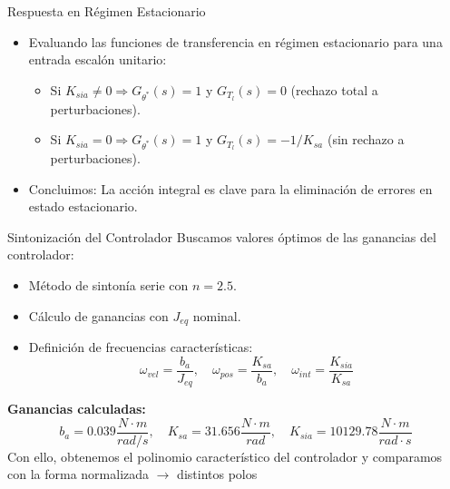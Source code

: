 \documentclass[12pt]{beamer}
\begin{document}
\begin{frame}{Respuesta en Régimen Estacionario}
    \begin{itemize}
        \item Evaluando las funciones de transferencia en régimen estacionario para una entrada escalón unitario:
        \begin{itemize}
            \item Si $K_{sia} \neq 0 \Rightarrow G_{\theta^*}(s) = 1$ y $G_{T_l}(s) = 0$ (rechazo total a perturbaciones).
            \item Si $K_{sia} = 0 \Rightarrow G_{\theta^*}(s) = 1$ y $G_{T_l}(s) = -1/K_{sa}$ (sin rechazo a perturbaciones).
        \end{itemize}
        \item Concluimos: La acción integral es clave para la eliminación de errores en estado estacionario.
    \end{itemize}
\end{frame}

\begin{frame}{Sintonización del Controlador}
Buscamos valores óptimos de las ganancias del controlador:
    \begin{itemize}
        \item Método de sintonía serie con $n = 2.5$.
        \item Cálculo de ganancias con $J_{eq}$ nominal.
        \item Definición de frecuencias características:
        \begin{equation}
            \omega_{vel} = \frac{b_a}{J_{eq}}, \quad \omega_{pos} = \frac{K_{sa}}{b_a}, \quad \omega_{int} = \frac{K_{sia}}{K_{sa}}
        \end{equation}
    \end{itemize}
    \textbf{Ganancias calculadas:}
    \begin{equation}
        b_a = 0.039 \frac{N \cdot m}{rad/s}, \quad K_{sa} = 31.656 \frac{N \cdot m}{rad}, \quad K_{sia} = 10129.78 \frac{N \cdot m}{rad \cdot s}
    \end{equation}
    Con ello, obtenemos el polinomio característico del controlador y comparamos con la forma normalizada $\rightarrow$ distintos polos
\end{frame}
\end{document}
